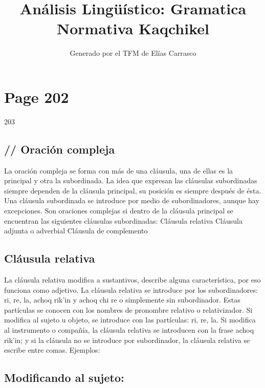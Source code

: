 \documentclass{article}%
\title{Análisis Lingüístico: Gramatica Normativa Kaqchikel}%
\author{Generado por el TFM de Elías Carrasco}%
\begin{document}
%
\normalsize%
\maketitle%
\section{Page 202}%
\label{sec:Page202}%
203 %
\subsection{// Oración compleja}%
\label{subsec://Oracincompleja}%

%
La oración compleja se forma con más de una cláusula, una de ellas es la principal y %
otra la subordinada. La idea que expresan las cláusulas subordinadas siempre dependen %
de la cláusula principal, su posición es siempre después de ésta. Una cláusula subordinada %
se introduce por medio de subordinadores, aunque hay excepciones. Son oraciones %
complejas si dentro de la cláusula principal se encuentran las siguientes cláusulas %
subordinadas: %
Cláusula relativa %
Cláusula adjunta o adverbial %
Cláusula de complemento %
\subsection{Cláusula relativa}%
\label{subsec:Clusularelativa}%

%
La cláusula relativa modifica a sustantivos, describe alguna característica, por eso %
funciona como adjetivo. La cláusula relativa se introduce por los subordinadores: ri, %
re, la, achoq rik'in y achoq chi re o simplemente sin subordinador. Estas partículas se %
conocen con los nombres de pronombre relativo o relativizador. Si modifica al sujeto u %
objeto, se introduce con las partículas: ri, re, la. Si modifica al instrumento o compañía, %
la cláusula relativa se introducen con la frase achoq rik'in; y si la cláusula no se %
introduce por subordinador, la cláusula relativa se escribe entre comas. Ejemplos: %
\subsection{Modificando al sujeto:}%
\label{subsec:Modificandoalsujeto}%
\end{document}
